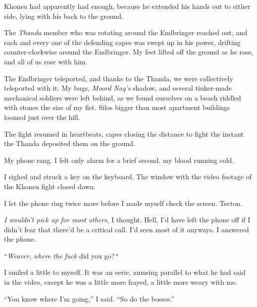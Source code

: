 Khonsu had apparently had enough, because he extended his hands out to either side, lying with his back to the ground.



The \emph{Thanda} member who was rotating around the Endbringer reached out, and each and every one of the defending capes was swept up in his power, drifting counter-clockwise around the Endbringer.  My feet lifted off the ground as he rose, and all of us rose with him.



The Endbringer teleported, and thanks to the Thanda, we were collectively teleported with it.  My bugs, \emph{Moord Nag's }shadow, and several tinker-made mechanical soldiers were left behind, as we found ourselves on a beach riddled with stones the size of my fist.  Silos bigger than most apartment buildings loomed just over the hill.



The fight resumed in heartbeats, capes closing the distance to fight the instant the Thanda deposited them on the ground.



\blacksquare



My phone rang. I felt only alarm for a brief second, my blood running cold.



I sighed and struck a key on the keyboard.  The window with the video footage of the Khonsu fight closed down.



I let the phone ring twice more before I made myself check the screen.  Tecton.



\emph{I wouldn't pick up for most others, }I thought.  Hell, I'd have left the phone off if I didn't fear that there'd be a critical call.  I'd seen most of it anyways.  I answered the phone.



``\emph{Weaver}, \emph{where the fuck} did you go?\emph{``}



I smiled a little to myself.  It was an eerie, amusing parallel to what he had said in the video, except he was a little more frayed, a little more weary with me.



``You know where I'm going,'' I said.  ``So do the bosses.''



